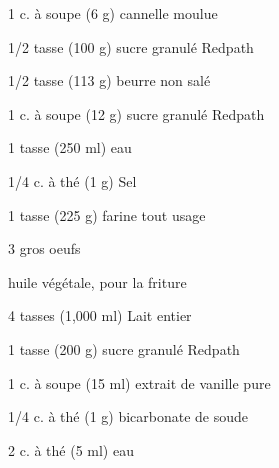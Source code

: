 


\totaltime{}


\begin{ingredients}
    \item 1 c. à soupe (6 g) cannelle moulue
    \item 1/2 tasse (100 g) sucre granulé Redpath
    \item 1/2 tasse (113 g) beurre non salé
    \item 1 c. à soupe (12 g) sucre granulé Redpath
    \item 1 tasse (250 ml) eau
    \item 1/4 c. à thé (1 g) Sel
    \item 1 tasse (225 g) farine tout usage
    \item 3 gros oeufs
    \item huile végétale, pour la friture
    \item 4 tasses (1,000 ml) Lait entier
    \item 1 tasse (200 g) sucre granulé Redpath
    \item 1 c. à soupe (15 ml) extrait de vanille pure
    \item 1/4 c. à thé (1 g) bicarbonate de soude
    \item 2 c. à thé (5 ml) eau
\end{ingredients}

